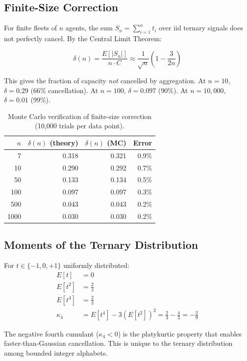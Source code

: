 \documentclass[11pt,a4paper]{article}
\newcommand{\trit}{\{-1,0,+1\}}
\newcommand{\C}{C}
\begin{document}
\subsection{Finite-Size Correction}

For finite fleets of $n$ agents, the sum $S_n = \sum_{i=1}^n t_i$ over iid ternary signals does not perfectly cancel. By the Central Limit Theorem:

\begin{equation}
\delta(n) = \frac{E[|S_n|]}{n \cdot \C} \approx \frac{1}{\sqrt{n}}\left(1 - \frac{3}{2n}\right)
\end{equation}

This gives the fraction of capacity \emph{not} cancelled by aggregation. At $n = 10$, $\delta = 0.29$ (66\% cancellation). At $n = 100$, $\delta = 0.097$ (90\%). At $n = 10{,}000$, $\delta = 0.01$ (99\%).

\begin{table}[h]
\centering
\begin{tabular}{rrrr}
\toprule
$n$ & $\delta(n)$ (theory) & $\delta(n)$ (MC) & Error \\
\midrule
7 & 0.318 & 0.321 & 0.9\% \\
10 & 0.290 & 0.292 & 0.7\% \\
50 & 0.133 & 0.134 & 0.5\% \\
100 & 0.097 & 0.097 & 0.3\% \\
500 & 0.043 & 0.043 & 0.2\% \\
1000 & 0.030 & 0.030 & 0.2\% \\
\bottomrule
\end{tabular}
\caption{Monte Carlo verification of finite-size correction (10,000 trials per data point).}
\label{tab:clt}
\end{table}

\subsection{Moments of the Ternary Distribution}

For $t \in \trit$ uniformly distributed:
\begin{align}
E[t] &= 0 \\
E[t^2] &= \frac{2}{3} \\
E[t^4] &= \frac{2}{3} \\
\kappa_4 &= E[t^4] - 3(E[t^2])^2 = \frac{2}{3} - \frac{4}{3} = -\frac{2}{9}
\end{align}

The negative fourth cumulant ($\kappa_4 < 0$) is the platykurtic property that enables faster-than-Gaussian cancellation. This is unique to the ternary distribution among bounded integer alphabets.
\end{document}
